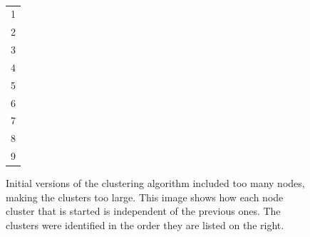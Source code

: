
\begin{figure}[tbhp]
	\centering
	\begin{minipage}[c]{7cm}
	\end{minipage}%
	\,
	\begin{minipage}[c]{1cm}
		\centering
		\begin{tabular}[b]{ l }
			\cellcolor{lyellow}1 \\
			\cellcolor{lorange}2 \\
			\cellcolor{lbrown}3 \\
			\cellcolor{lgreen}4 \\
			\cellcolor{lblue}5 \\
			\cellcolor{lpurple}6 \\
			\cellcolor{lred}7 \\
			\cellcolor{silver}8 \\
			\cellcolor{lgrey}9 \\
		\end{tabular}
	\end{minipage}

	\caption{Initial versions of the clustering algorithm included too many
	nodes, making the clusters too large. This image shows how each node
	cluster that is started is independent of the previous ones. The clusters
	were identified in the order they are listed on the right.}
	\label{fig:multiple-clusters-colours}

\end{figure}

